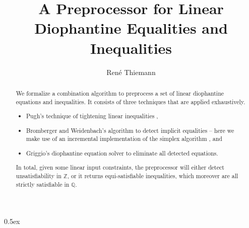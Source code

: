 \documentclass[11pt,a4paper]{article}
\begin{document}
\title{A Preprocessor for Linear Diophantine Equalities and Inequalities}

\author{Ren\'e Thiemann}

\maketitle

\begin{abstract}
We formalize a combination algorithm to preprocess a set of linear
diophantine equations and inequalities. It consists of three techniques that are applied
exhaustively.
\begin{itemize}
\item Pugh's technique of tightening linear inequalities \cite{DBLP:conf/sc/Pught91},
\item Bromberger and Weidenbach's algorithm to detect implicit equalities \cite{DBLP:journals/fmsd/BrombergerW17} -- here we make use of an incremental implementation of the simplex algorithm \cite{DBLP:journals/afp/MaricST18}, and
\item Griggio's diophantine equation solver \cite{DBLP:journals/jsat/Griggio12} to eliminate all detected equations.
\end{itemize}

In total, given some linear input constraints, the preprocessor will either detect unsatisfiability 
in $\mathbb{Z}$, 
or it returns equi-satisfiable inequalities, which moreover are all strictly satisfiable 
in $\mathbb{Q}$.
\end{abstract}

\tableofcontents

\parindent 0pt\parskip 0.5ex





\end{document}
